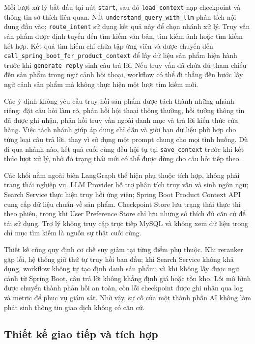 Mỗi lượt xử lý bắt đầu tại nút \texttt{start}, sau đó \texttt{load\_context} nạp checkpoint và thông tin sở thích liên quan. Nút \texttt{understand\_query\_with\_llm} phân tích nội dung đầu vào; \texttt{route\_intent} sử dụng kết quả này để chọn nhánh xử lý. Truy vấn sản phẩm được định tuyến đến tìm kiếm văn bản, tìm kiếm ảnh hoặc tìm kiếm kết hợp. Kết quả tìm kiếm chỉ chứa tập ứng viên và được chuyển đến \texttt{call\_spring\_boot\_for\_product\_context} để lấy dữ liệu sản phẩm hiện hành trước khi \texttt{generate\_reply} sinh câu trả lời. Nếu truy vấn đã chứa đủ tham chiếu đến sản phẩm trong ngữ cảnh hội thoại, workflow có thể đi thẳng đến bước lấy ngữ cảnh sản phẩm mà không thực hiện một lượt tìm kiếm mới.

Các ý định không yêu cầu truy hồi sản phẩm được tách thành những nhánh riêng: đặt câu hỏi làm rõ, phản hồi hội thoại thông thường, hồi tưởng thông tin đã được ghi nhận, phản hồi truy vấn ngoài danh mục và trả lời kiến thức cửa hàng. Việc tách nhánh giúp áp dụng chỉ dẫn và giới hạn dữ liệu phù hợp cho từng loại câu trả lời, thay vì sử dụng một prompt chung cho mọi tình huống. Dù đi qua nhánh nào, kết quả cuối cùng đều hội tụ tại \texttt{save\_context} trước khi kết thúc lượt xử lý, nhờ đó trạng thái mới có thể được dùng cho câu hỏi tiếp theo.

Các khối nằm ngoài biên LangGraph thể hiện phụ thuộc tích hợp, không phải trạng thái nghiệp vụ. LLM Provider hỗ trợ phân tích truy vấn và sinh ngôn ngữ; Search Service thực hiện truy hồi ứng viên; Spring Boot Product Context API cung cấp dữ liệu chuẩn về sản phẩm. Checkpoint Store lưu trạng thái thực thi theo phiên, trong khi User Preference Store chỉ lưu những sở thích đủ căn cứ để tái sử dụng. Trợ lý không truy cập trực tiếp MySQL và không xem dữ liệu trong chỉ mục tìm kiếm là nguồn sự thật cuối cùng.

Thiết kế cũng quy định cơ chế suy giảm tại từng điểm phụ thuộc. Khi reranker gặp lỗi, hệ thống giữ thứ tự truy hồi ban đầu; khi Search Service không khả dụng, workflow không tự tạo định danh sản phẩm; và khi không lấy được ngữ cảnh từ Spring Boot, câu trả lời không khẳng định giá hoặc tồn kho. Lỗi mô hình được chuyển thành phản hồi an toàn, còn lỗi checkpoint được ghi nhận qua log và metric để phục vụ giám sát. Nhờ vậy, sự cố của một thành phần AI không làm phát sinh thông tin giao dịch không có căn cứ.

\subsection{Thiết kế giao tiếp và tích hợp}

